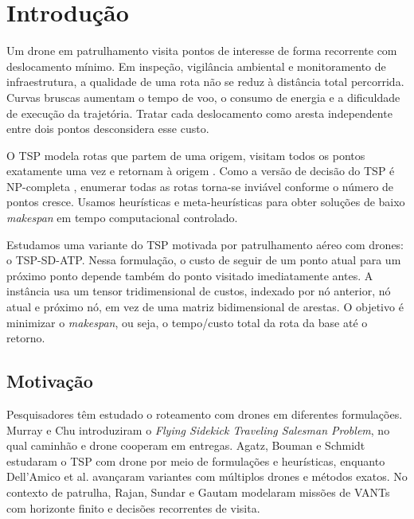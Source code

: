 \chapter[Introdução]{Introdução}

Um drone em patrulhamento visita pontos de interesse de forma recorrente com deslocamento mínimo. Em inspeção, vigilância ambiental e monitoramento de infraestrutura, a qualidade de uma rota não se reduz à distância total percorrida. Curvas bruscas aumentam o tempo de voo, o consumo de energia e a dificuldade de execução da trajetória. Tratar cada deslocamento como aresta independente entre dois pontos desconsidera esse custo.

O \ac{TSP} modela rotas que partem de uma origem, visitam todos os pontos exatamente uma vez e retornam à origem \cite{applegate2006traveling}. Como a versão de decisão do \ac{TSP} é \ac{NP}-completa \cite{garey1979computers}, enumerar todas as rotas torna-se inviável conforme o número de pontos cresce. Usamos heurísticas e meta-heurísticas para obter soluções de baixo \textit{makespan} em tempo computacional controlado.

Estudamos uma variante do \ac{TSP} motivada por patrulhamento aéreo com drones: o \ac{TSP-SD-ATP}. Nessa formulação, o custo de seguir de um ponto atual para um próximo ponto depende também do ponto visitado imediatamente antes. A instância usa um tensor tridimensional de custos, indexado por nó anterior, nó atual e próximo nó, em vez de uma matriz bidimensional de arestas. O objetivo é minimizar o \textit{makespan}, ou seja, o tempo/custo total da rota da base até o retorno.

\section{Motivação}

Pesquisadores têm estudado o roteamento com drones em diferentes formulações. Murray e Chu \cite{murray2015flying} introduziram o \textit{Flying Sidekick Traveling Salesman Problem}, no qual caminhão e drone cooperam em entregas. Agatz, Bouman e Schmidt \cite{agatz2018optimization} estudaram o \ac{TSP} com drone por meio de formulações e heurísticas, enquanto Dell'Amico et al. \cite{dellamico2021multiple,dellamico2022exact} avançaram variantes com múltiplos drones e métodos exatos. No contexto de patrulha, Rajan, Sundar e Gautam \cite{rajan2022routing} modelaram missões de \acp{VANT} com horizonte finito e decisões recorrentes de visita.

